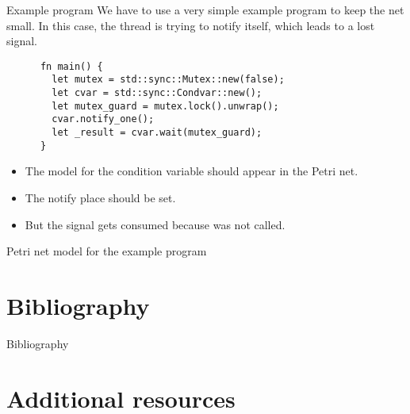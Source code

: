 \documentclass{beamer}
\begin{document}
\begin{frame}[fragile]{Example program}
  We have to use a very simple example program to keep the net small.
  In this case, the thread is trying to notify itself, which leads to a lost signal.

  \begin{listing}
    \begin{verbatim}
      fn main() {
        let mutex = std::sync::Mutex::new(false);
        let cvar = std::sync::Condvar::new();
        let mutex_guard = mutex.lock().unwrap();
        cvar.notify_one();
        let _result = cvar.wait(mutex_guard);
      }     
    \end{verbatim}
  \end{listing}

  \begin{itemize}
    \item The model for the condition variable should appear in the Petri net.
    \item The notify place should be set.
    \item But the signal gets consumed because  was not called.
  \end{itemize}
\end{frame}

\begin{frame}{Petri net model for the example program}
  \begin{figure}
    \centering
    
  \end{figure}
\end{frame}

\section{Bibliography}

\begin{frame}[allowframebreaks]{Bibliography}
  \tiny
  
  
\end{frame}

\section{Additional resources}
\end{document}
